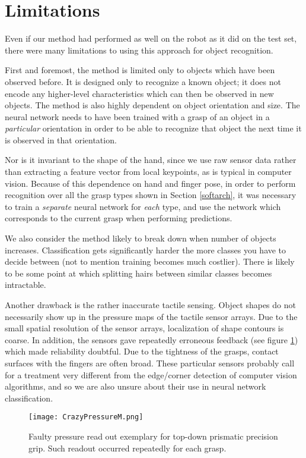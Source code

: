\renewcommand{\thesection}{\Roman{section}}
\section{Limitations}

Even if our method had performed as well on the robot as it did on the test set, there were many limitations to using this approach for object recognition.

First and foremost, the method is limited only to objects which have been observed before. It is designed only to recognize a known object; it does not encode any higher-level characteristics which can then be observed in new objects. The method is also highly dependent on object orientation and size. The neural network needs to have been trained with a grasp of an object in a \emph{particular} orientation in order to be able to recognize that object the next time it is observed in that orientation.

Nor is it invariant to the shape of the hand, since we use raw sensor data rather than extracting a feature vector from local keypoints, as is typical in computer vision. Because of this dependence on hand and finger pose, in order to perform recognition over all the grasp types shown in Section \ref{softarch}, it was necessary to train a \emph{separate} neural network for \emph{each} type, and use the network which corresponds to the current grasp when performing predictions.

We also consider the method likely to break down when number of objects increases. Classification gets significantly harder the more classes you have to decide between (not to mention training becomes much costlier). There is likely to be some point at which splitting hairs between similar classes becomes intractable.

Another drawback is the rather inaccurate tactile sensing. Object shapes do not necessarily show up in the pressure maps of the tactile sensor arrays. Due to the small spatial resolution of the sensor arrays, localization of shape contours is coarse. In addition, the sensors gave repeatedly erroneous feedback (see figure \ref{crazymap}) which made reliability doubtful. Due to the tightness of the grasps, contact surfaces with the fingers are often broad. These particular sensors probably call for a treatment very different from the edge/corner detection of computer vision algorithms, and so we are also unsure about their use in neural network classification.
\begin{figure}[H]
        \hspace{-1.3cm}
         \texttt{[image: CrazyPressureM.png]}
          \caption{Faulty pressure read out exemplary for top-down prismatic precision grip. Such readout occurred repeatedly for each grasp.}
          \label{crazymap}
\end{figure}